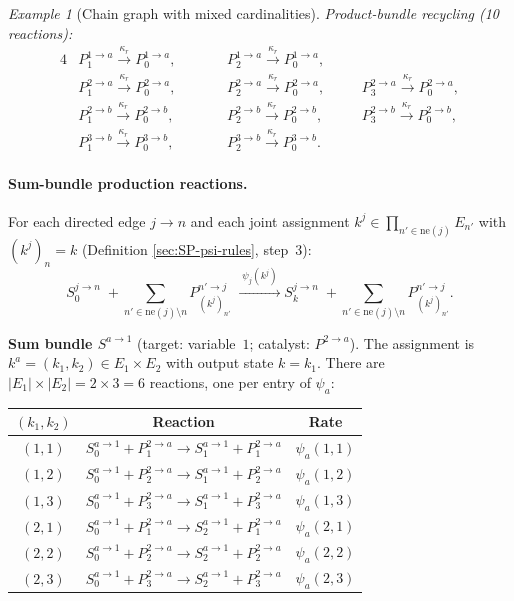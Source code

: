 \documentclass{article}
\theoremstyle{plain}
\theoremstyle{definition}
\theoremstyle{remark}
\newtheorem{example}{Example}[section]
\newcommand{\<}{\langle}
\renewcommand{\>}{\rangle}
\begin{document}
\begin{example}[Chain graph with mixed cardinalities]
\noindent\emph{Product-bundle recycling (10 reactions):}
\begin{alignat*}{4}
&P^{1\to a}_1 \xrightarrow{\kappa_r} P^{1\to a}_0,\qquad
&&P^{1\to a}_2 \xrightarrow{\kappa_r} P^{1\to a}_0,
\\[3pt]
&P^{2\to a}_1 \xrightarrow{\kappa_r} P^{2\to a}_0,\quad
&&P^{2\to a}_2 \xrightarrow{\kappa_r} P^{2\to a}_0,\quad
&&P^{2\to a}_3 \xrightarrow{\kappa_r} P^{2\to a}_0,
\\[3pt]
&P^{2\to b}_1 \xrightarrow{\kappa_r} P^{2\to b}_0,\quad
&&P^{2\to b}_2 \xrightarrow{\kappa_r} P^{2\to b}_0,\quad
&&P^{2\to b}_3 \xrightarrow{\kappa_r} P^{2\to b}_0,
\\[3pt]
&P^{3\to b}_1 \xrightarrow{\kappa_r} P^{3\to b}_0,\qquad
&&P^{3\to b}_2 \xrightarrow{\kappa_r} P^{3\to b}_0.
\end{alignat*}
 
 
\paragraph{Sum-bundle production reactions.}
For each directed edge $j\to n$ and each joint assignment
$k^j\in\prod_{n'\in\mathrm{ne}(j)} E_{n'}$ with $(k^j)_n=k$
(Definition \ref{sec:SP-psi-rules}, step~3):
\[
S^{j\to n}_0
\;+\!\!\sum_{n'\in\mathrm{ne}(j)\setminus n}\!\! P^{n'\to j}_{(k^j)_{n'}}
\;\xrightarrow{\;\psi_j(k^j)\;}
S^{j\to n}_k
\;+\!\!\sum_{n'\in\mathrm{ne}(j)\setminus n}\!\! P^{n'\to j}_{(k^j)_{n'}}.
\]
 
\smallskip
\noindent\textbf{Sum bundle $S^{a\to 1}$}
(target: variable~$1$; catalyst: $P^{2\to a}$).
The assignment is $k^a = (k_1, k_2) \in E_1\times E_2$
with output state $k = k_1$.
There are $|E_1|\times|E_2| = 2\times 3 = 6$ reactions, one per
entry of $\psi_a$:
 
\begin{center}
\renewcommand{\arraystretch}{1.3}
\begin{tabular}{@{}ccc@{}}
\toprule
$(k_1,k_2)$ & Reaction & Rate \\
\midrule
$(1,1)$ & $S^{a\to 1}_0 + P^{2\to a}_1 \to S^{a\to 1}_1 + P^{2\to a}_1$ & $\psi_a(1,1)$ \\
$(1,2)$ & $S^{a\to 1}_0 + P^{2\to a}_2 \to S^{a\to 1}_1 + P^{2\to a}_2$ & $\psi_a(1,2)$ \\
$(1,3)$ & $S^{a\to 1}_0 + P^{2\to a}_3 \to S^{a\to 1}_1 + P^{2\to a}_3$ & $\psi_a(1,3)$ \\
$(2,1)$ & $S^{a\to 1}_0 + P^{2\to a}_1 \to S^{a\to 1}_2 + P^{2\to a}_1$ & $\psi_a(2,1)$ \\
$(2,2)$ & $S^{a\to 1}_0 + P^{2\to a}_2 \to S^{a\to 1}_2 + P^{2\to a}_2$ & $\psi_a(2,2)$ \\
$(2,3)$ & $S^{a\to 1}_0 + P^{2\to a}_3 \to S^{a\to 1}_2 + P^{2\to a}_3$ & $\psi_a(2,3)$ \\
\bottomrule
\end{tabular}
\end{center}
 

\end{example}
\end{document}
